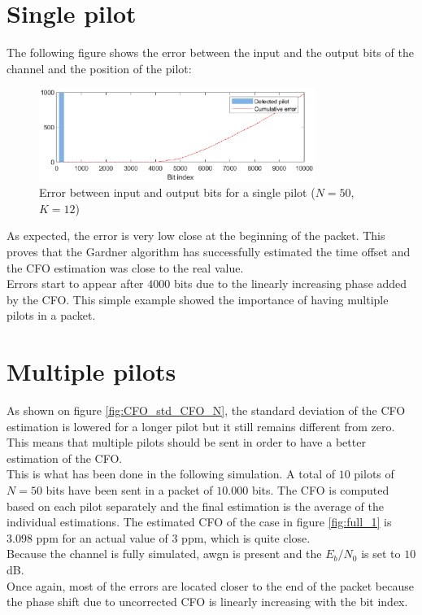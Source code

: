 \documentclass[10pt,a4paper]{ULBreport}
\begin{document}
\section{Single pilot}
The following figure shows the error between the input and the output bits of the channel and the position of the pilot:
\begin{figure}[H]
    \centering
    \includegraphics[width=0.8\textwidth]{pic/full_0.eps}
    \caption{Error between input and output bits for a single pilot ($N=50$, $K=12$)}
    \label{fig:full_0}
\end{figure}
As expected, the error is very low close at the beginning of the packet. This proves that the Gardner algorithm has successfully estimated the time offset and the CFO estimation was close to the real value. \\
Errors start to appear after $4000$ bits due to the linearly increasing phase added by the CFO. This simple example showed the importance of having multiple pilots in a packet.

\section{Multiple pilots}

As shown on figure \ref{fig:CFO_std_CFO_N}, the standard deviation of the CFO estimation is lowered for a longer pilot but it still remains different from zero. This means that multiple pilots should be sent in order to have a better estimation of the CFO. \\
This is what has been done in the following simulation. A total of $10$ pilots of $N=50$ bits have been sent in a packet of $10.000$ bits. The CFO is computed based on each pilot separately and the final estimation is the average of the individual estimations. The estimated CFO of the case in figure \ref{fig:full_1} is $3.098$ ppm for an actual value of $3$ ppm, which is quite close.\\
Because the channel is fully simulated, awgn is present and the $E_b/N_0$ is set to $10$ dB. \\
Once again, most of the errors are located closer to the end of the packet because the phase shift due to uncorrected CFO is linearly increasing with the bit index.
\end{document}
